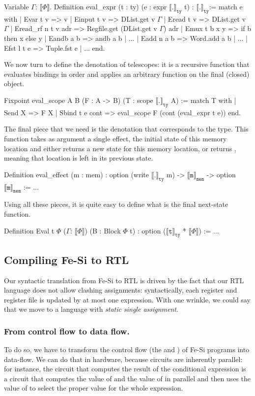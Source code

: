 \documentclass{llncs}
\newcommand{\denote}[1]{\llbracket #1 \rrbracket}
\newcommand{\denotety}[1]{\denote{\mathtt{#1}}_{\mathtt{ty}}}
\newcommand{\denotemem}[1]{\denote{\mathtt{#1}}_{\mathtt{mem}}}
\begin{document}
\begin{mcoq}
Variable $\Gamma$: $\denote{\Phi}$. 
Definition eval_expr (t : ty) (e : expr $\denotety{.}$ t) : $\denotety{.}$:=
match e with
| Evar t v => v
| Einput t v => DList.get v $\Gamma$
| Eread  t v =>  DList.get v $\Gamma$
| Eread_rf n t v adr => Regfile.get (DList.get v $\Gamma$) adr
| Emux t b x y => if b then x else y 
| Eandb a b => andb a b | ...
| Eadd n a b => Word.add a b  | ...
| Efst l t e => Tuple.fst e | ...
end. 
\end{mcoq}

We now turn to define the denotation of telescopes: it is a
recursive function that evaluates bindings in order and applies
an arbitrary function on the final (closed) object. 
\begin{mcoq}
Fixpoint eval_scope {A B} (F : A -> B) (T : scope $\denotety{.}$ A) :=
match T with 
| Send X => F X
| Sbind t e cont => eval_scope F (cont (eval_expr t e))
end.   
\end{mcoq}
%
The final piece that we need is the denotation that corresponds to the
 type. This function takes as argument a single effect,
the initial state of this memory location  and either returns a new
state for this memory location, or returns , meaning that
location is left in its previous state.
\begin{mcoq}
Definition eval_effect (m : mem) : option (write $\denotety{.}$ m) -> $\denotemem{m}$ -> option $\denotemem{m}$ := ... 
\end{mcoq}
%
Using all these pieces, it is quite easy to define what is the final
next-state function. 
\begin{mcoq}
Definition Eval {t} {$\Phi$} ($\Gamma$: $\denote{\Phi}$) (B : Block $\Phi$ t) : option ($\denotety{t}$ * $\denote{\Phi}$) := ...
\end{mcoq}

\subsection{Compiling Fe-Si to RTL} 
Our syntactic translation from Fe-Si to RTL is driven by the fact that
our RTL language does not allow clashing assignments: syntactically,
each register and register file is updated by at most one 
expression.
%
With one wrinkle, we could say that we move to a language with
\emph{static single assignment}. 

\subsubsection{From control flow to data flow.}To do so, we have to
transform the control flow (the  and ) of
Fe-Si programs into data-flow.
%
We can do that in hardware, because circuits are inherently parallel:
for instance, the circuit that computes the result of the conditional
expression \mbox{} is a circuit that computes the
value of  and the value of  in parallel and then uses
the value of  to select the proper value for the whole
expression.
\end{document}
